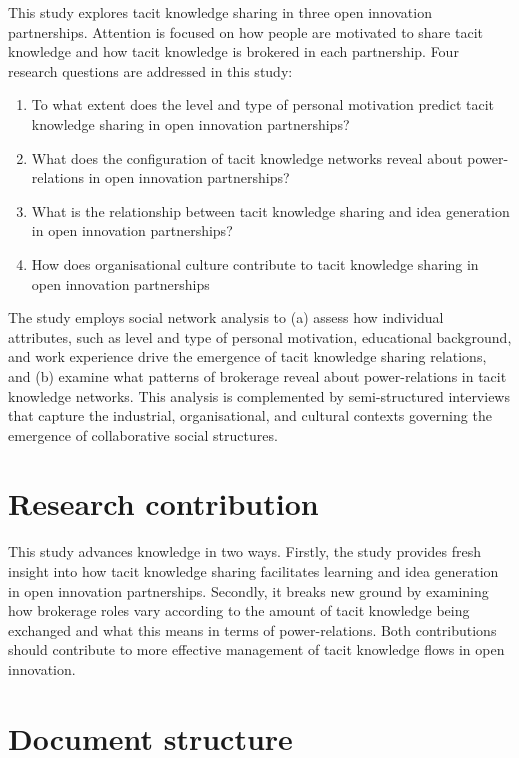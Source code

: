 This study explores tacit knowledge sharing in three open innovation partnerships. Attention is focused on how people are motivated to share tacit knowledge and how tacit knowledge is brokered in each partnership. Four research questions are addressed in this study: \medskip

\begin{description}
    \begin{enumerate}
        \item To what extent does the level and type of personal motivation predict tacit knowledge sharing in open innovation partnerships?
	    \item What does the configuration of tacit knowledge networks reveal about power-relations in open innovation partnerships?
	    \item What is the relationship between tacit knowledge sharing and idea generation in open innovation partnerships?
	   \item How does organisational culture contribute to tacit knowledge sharing in open innovation partnerships
    \end{enumerate}
\end{description}

The study employs social network analysis to (a) assess how individual attributes, such as level and type of personal motivation, educational background, and work experience drive the emergence of tacit knowledge sharing relations, and (b) examine what patterns of brokerage reveal about power-relations in tacit knowledge networks. This analysis is complemented by semi-structured interviews that capture the industrial, organisational, and cultural contexts governing the emergence of collaborative social structures. \medskip  

\section{Research contribution}

This study advances knowledge in two ways. Firstly, the study provides fresh insight into how tacit knowledge sharing facilitates learning and idea generation in open innovation partnerships. Secondly, it breaks new ground by examining how brokerage roles vary according to the amount of tacit knowledge being exchanged and what this means in terms of power-relations. Both contributions should contribute to more effective management of tacit knowledge flows in open innovation. \medskip

\section{Document structure}

